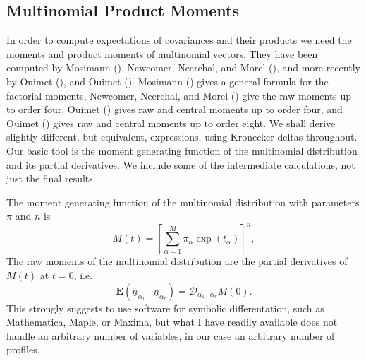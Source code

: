 \documentclass[
  12pt,
  letterpaper,
  DIV=11,
  numbers=noendperiod]{scrartcl}
\newcommand{\ul}[1]{\underline{#1}}
\begin{document}
\subsection{Multinomial Product
Moments}\label{multinomial-product-moments}

In order to compute expectations of covariances and their products we
need the moments and product moments of multinomial vectors. They have
been computed by Mosimann (), Newcomer,
Neerchal, and Morel (),
and more recently by Ouimet (), and Ouimet
(). Mosimann
() gives a general formula for the
factorial moments, Newcomer, Neerchal, and Morel
() give the raw moments
up to order four, Ouimet () gives raw and
central moments up to order four, and Ouimet
() gives raw and central moments up to
order eight. We shall derive slightly different, but equivalent,
expressions, using Kronecker deltas throughout. Our basic tool is the
moment generating function of the multinomial distribution and its
partial derivatives. We include some of the intermediate calculations,
not just the final results.

The moment generating function of the multinomial distribution with
parameters \(\pi\) and \(n\) is \begin{equation}
M(t)=\left[\sum_{\alpha=1}^M\pi_\alpha\exp(t_\alpha)\right]^n,\label{eq-mgf}
\end{equation} The raw moments of the multinomial distribution are the
partial derivatives of \(M(t)\) at \(t=0\), i.e. \begin{equation}
\mathbf{E}(\ul{n}_{\alpha_1}\cdots\ul{n}_{\alpha_r})=\mathcal{D}_{\alpha_1\cdots\alpha_r} M(0).\label{eq-m1}
\end{equation} This strongly suggests to use software for symbolic
differentation, such as Mathematica, Maple, or Maxima, but what I have
readily available does not handle an arbitrary number of variables, in
our case an arbitrary number of profiles.
\end{document}
